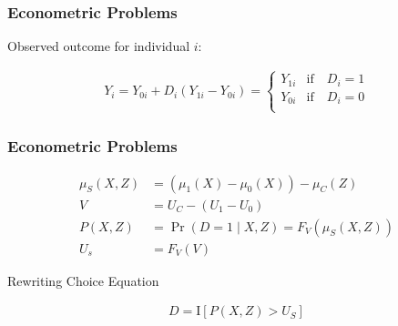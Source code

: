 \begin{frame}
\frametitle{Econometric Problems}

Observed outcome for individual \(i\):

\begin{align*}
Y_i = Y_{0i} + D_i (Y_{1i} - Y_{0i}) = 
\begin{cases}
Y_{1i} & \text{if}\quad D_i = 1 \\
Y_{0i} & \text{if}\quad D_i = 0 \\
\end{cases}
\end{align*}

\end{frame}


\begin{frame}
\frametitle{Econometric Problems}

\begin{align*}
\mu_S(X, Z) & = (\mu_1(X) - \mu_0(X)) - \mu_C(Z) \\
V & = U_C - (U_1 - U_0) \\
P(X, Z) & = \Pr(D = 1 \mid X, Z)  = F_V(\mu_S(X, Z)) \\
U_s & = F_V(V) 
\end{align*}

Rewriting Choice Equation

\begin{align*}
D = \mathrm{I}[P(X,Z) > U_S]
\end{align*}

\end{frame}


